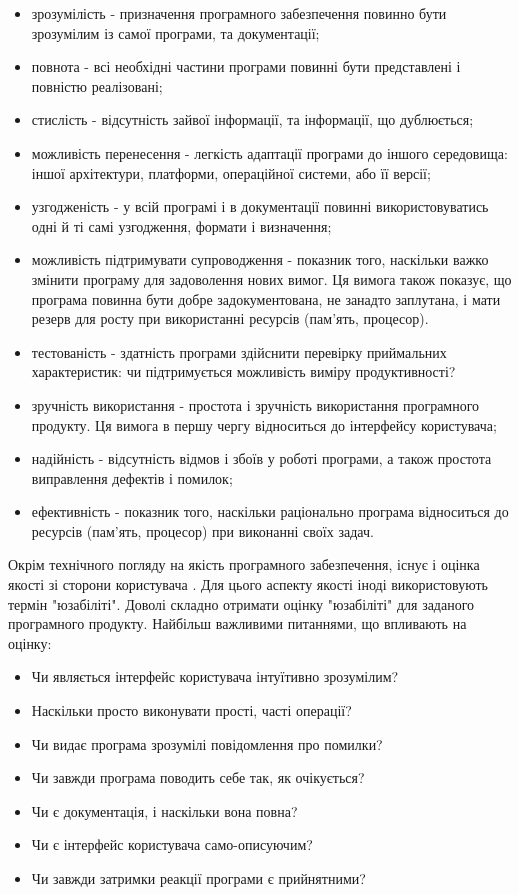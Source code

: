 \begin{itemize}
    \item зрозумілість - призначення програмного забезпечення 
      повинно бути зрозумілим із самої програми, та документації;
    \item повнота - всі необхідні частини програми
      повинні бути представлені і повністю реалізовані;
    \item стислість - відсутність зайвої інформації,
      та інформації, що дублюється;
    \item можливість перенесення - легкість адаптації
      програми до іншого середовища: іншої архітектури,
      платформи, операційної системи, або її версії;
    \item узгодженість - у всій програмі і в документації
      повинні використовуватись одні й ті самі узгодження, формати і визначення;
    \item можливість підтримувати супроводження - показник
      того, наскільки важко змінити програму для задоволення нових вимог.
      Ця вимога також показує, що програма повинна бути добре
      задокументована, не занадто заплутана, і мати резерв
      для росту при використанні ресурсів (пам’ять, процесор).
    \item тестованість - здатність програми здійснити перевірку
      приймальних характеристик: чи підтримується
      можливість виміру продуктивності?
    \item зручність використання - простота і зручність
      використання програмного продукту. Ця вимога
      в першу чергу відноситься до інтерфейсу користувача;
    \item надійність - відсутність відмов і збоїв у роботі
      програми, а також простота виправлення дефектів і помилок;
    \item ефективність - показник того, наскільки раціонально
      програма відноситься до ресурсів (пам’ять, процесор)
      при виконанні своїх задач.
\end{itemize}

Окрім технічного погляду на якість програмного забезпечення,
існує і оцінка якості зі сторони користувача \cite{os-development,testing-black}.
Для цього аспекту якості іноді використовують термін "юзабіліті".
Доволі складно отримати оцінку "юзабіліті" для
заданого програмного продукту. Найбільш важливими питаннями,
що впливають на оцінку:

\begin{itemize}
    \item Чи являється інтерфейс користувача інтуїтивно зрозумілим?
    \item Наскільки просто виконувати прості, часті операції?
    \item Чи видає програма зрозумілі повідомлення про помилки?
    \item Чи завжди програма поводить себе так, як очікується?
    \item Чи є документація, і наскільки вона повна?
    \item Чи є інтерфейс користувача само-описуючим?
    \item Чи завжди затримки реакції програми є прийнятними?
\end{itemize}

